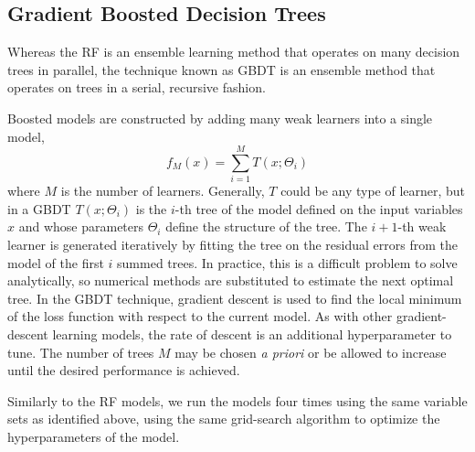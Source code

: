 \subsection{Gradient Boosted Decision Trees}

Whereas the RF is an ensemble learning method that operates on many
decision trees in parallel, the technique known as GBDT is an ensemble
method that operates on trees in a serial, recursive fashion.

Boosted models are constructed by adding many weak learners into a
single model, $$f_{M}(x) = \sum_{i=1}^{M}{T(x;\Theta_{i})}$$ where $M$
is the number of learners.  Generally, $T$ could be any type of
learner, but in a GBDT $T(x;\Theta_{i})$ is the $i$-th tree of the
model defined on the input variables $x$ and whose parameters
$\Theta_{i}$ define the structure of the tree. The $i+1$-th weak
learner is generated iteratively by fitting the tree on the residual
errors from the model of the first $i$ summed trees. In practice, this
is a difficult problem to solve analytically, so numerical methods are
substituted to estimate the next optimal tree. In the GBDT technique,
gradient descent is used to find the local minimum of the loss
function with respect to the current model. As with other
gradient-descent learning models, the rate of descent is an additional
hyperparameter to tune. The number of trees $M$ may be chosen
\textit{a priori} or be allowed to increase until the desired
performance is achieved.

Similarly to the RF models, we run the models four times using the
same variable sets as identified above, using the same grid-search
algorithm to optimize the hyperparameters of the model.
